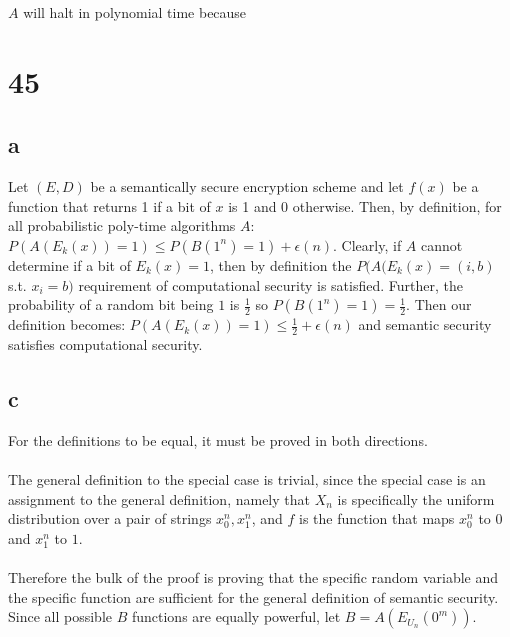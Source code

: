 \documentclass[letterpaper,notitlepage,twoside]{article}
\begin{document}
$A$ will halt in polynomial time because \\

\section*{45}
\subsection*{a}
Let $(E, D)$ be a semantically secure encryption scheme and let $f(x)$ be a function that returns 1 if a bit of $x$ is 1 and 0 otherwise.
Then, by definition, for all probabilistic poly-time algorithms $A$: $P(A(E_k(x)) = 1) \leq P(B(1^{n}) = 1) + \epsilon(n)$.
Clearly, if $A$ cannot determine if a bit of $E_k(x) = 1$, then by definition the $P(A(E_k(x) = (i,b)$ s.t. $x_i = b)$ requirement of computational security is satisfied. 
Further, the probability of a random bit being $1$ is $\frac{1}{2}$ so $P(B(1^{n}) = 1) = \frac{1}{2}$. 
Then our definition becomes: $P(A(E_k(x)) = 1) \leq \frac{1}{2} + \epsilon(n)$ and semantic security satisfies computational security.







\subsection*{c}
For the definitions to be equal, it must be proved in both directions.\\\\
The general definition to the special case is trivial, since the special case is an assignment to the general definition, namely that $X_n$ is specifically the uniform distribution over a pair of strings $x_0^n, x_1^n$, and $f$ is the function that maps $x_0^n$ to $0$ and $x_1^n$ to $1$.\\\\
Therefore the bulk of the proof is proving that the specific random variable and the specific function are sufficient for the general definition of semantic security. Since all possible $B$ functions are equally powerful, let $B = A(E_{U_n}(0^m))$.
\end{document}
